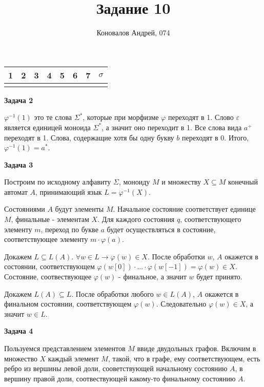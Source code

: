 \documentclass[10pt]{article}
\title{Задание 10}
\author{Коновалов Андрей, 074}
\date{}
\let \eps \varepsilon
\begin{document}
\maketitle

\noindent
\begin{tabularx}{\textwidth}{|C|C|C|C|C|C|C|C|}
   & 2 & 3 & 4 & 5 & 6 & 7 & $\sigma$ \\
  \hline
  &&&&&&& \\
  \hline
\end{tabularx}

\bigskip

{\bf Задача 2}

$\varphi^{-1}(1)$ это те слова $\Sigma^*$, которые при морфизме $\varphi$ переходят в 1.
Слово $\eps$ является единицей моноида $\Sigma^*$, а значит оно переходит в 1.
Все слова вида $a^+$ переходят в 1.
Слова, содержащие хотя бы одну букву $b$ переходят в 0.
Итого, $\varphi^{-1}(1) = a^*$.

\medskip

{\bf Задача 3}

Построим по исходному алфавиту $\Sigma$, моноиду $M$ и множеству $X \subseteq M$ конечный автомат $A$, принимающий язык $L = \varphi^{-1}(X)$.

Состояниями $A$ будут элементы $M$.
Начальное состояние соответствует единице $M$, финальные - элементам $X$.
Для каждого состояния $q$, соответствующего элементу $m$, переход по букве $a$ будет осуществляться в состояние, соответствующее элементу $m \cdot \varphi(a)$.

Докажем $L \subseteq L(A)$.
$\forall w \in L \rightarrow \varphi(w) \in X$.
После обработки $w$, $A$ окажется в состоянии, соответствующем $\varphi(w[0]) \cdot ... \cdot \varphi(w[-1]) = \varphi(w) \in X$.
Состояние, соотвествующее $\varphi(w)$ - финальное, а значит $w$ будет принято.

Докажем $L(A) \subseteq L$.
После обработки любого $w \in L(A)$, $A$ окажется в финальном состоянии, соответствующем $\varphi(w)$.
Следовательно $\varphi(w) \in X$, а значит $w \in L$.

\medskip

{\bf Задача 4}

Пользуемся представлением элементов $M$ ввиде двудольных графов.
Включим в множество $X$ каждый элемент $M$, такой, что в графе, ему соответствующем, есть ребро из вершины левой доли, сооветствующей начальному состоянию $A$, в вершину правой доли, соотвествующей какому-то финальному состоянию $A$.
\end{document}
